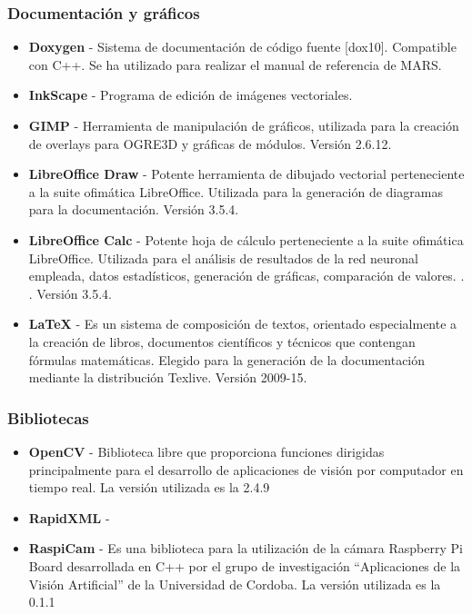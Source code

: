 \begin{description}
\subsubsection{Documentación y gráficos}
\begin{itemize}
\item \textbf{Doxygen} - Sistema de documentación de código fuente [dox10]. Compatible con C++. Se ha utilizado para realizar el manual de referencia de MARS.

\item \textbf{InkScape} - Programa de edición de imágenes vectoriales.

\item \textbf{GIMP} - Herramienta de manipulación de gráficos, utilizada para la creación de overlays para OGRE3D y gráficas de módulos. Versión 2.6.12.

\item \textbf{LibreOffice Draw} - Potente herramienta de dibujado vectorial perteneciente a la suite ofimática LibreOffice. Utilizada para la generación de diagramas para la documentación. Versión 3.5.4.

\item \textbf{LibreOffice Calc} - Potente hoja de cálculo perteneciente a la suite ofimática LibreOffice. Utilizada para el análisis de resultados de la red neuronal empleada, datos estadísticos, generación de gráficas, comparación de valores. . . Versión 3.5.4.
\item \textbf{\LaTeX{}} - Es un sistema de composición de textos, orientado especialmente a la creación de libros, documentos científicos y técnicos que contengan fórmulas matemáticas. Elegido para la generación de la documentación mediante la distribución Texlive. Versión 2009-15.
\end{itemize}


\subsubsection{Bibliotecas}
\begin{itemize}
\item \textbf{OpenCV} - Biblioteca libre que proporciona funciones dirigidas principalmente para el desarrollo de aplicaciones de visión por computador en tiempo real. La versión utilizada es la 2.4.9
\item \textbf{RapidXML} - 
\item \textbf{RaspiCam} -  Es una biblioteca para la utilización de la cámara Raspberry Pi Board desarrollada en C++ por el grupo de investigación ``Aplicaciones de la Visión Artificial'' de la Universidad de Cordoba. La versión utilizada es la 0.1.1 
\end{itemize}


\end{description}
